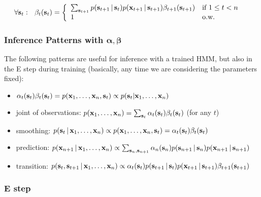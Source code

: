 \documentclass[12pt]{article}
\begin{document}
{\small
	\begin{align*}
	\forall \bolds_t:\ \ 
	\beta_t(\bolds_t)&=\left\{
	\begin{array}{ll}
	\sum_{\bolds_{t+1}} p(\bolds_{t+1}\given\bolds_{t})
	p(\boldx_{t+1}\given\bolds_{t+1})\beta_{t+1}(\bolds_{t+1})
	&\mbox{if $1\leq t< n$}\\
	1 &\mbox{o.w.}
	\end{array}
	\right.
	\end{align*}
}

\subsubsection{Inference Patterns with $\boldsymbol{\alpha},\boldsymbol{\beta}$}

The following patterns are useful for inference with a trained HMM, but also in the E step during training (basically, any time we are considering the parameters fixed):

\begin{itemize}
	
	\item  $\alpha_t(\mathbf{s}_t)\beta_t(\mathbf{s}_t) = p(\mathbf{x}_1,\ldots,\mathbf{x}_n,\mathbf{s}_t) \propto p(\mathbf{s}_t | \mathbf{x}_1,\ldots,\mathbf{x}_n)$
	
	\item joint of observations: $p(\mathbf{x}_1,\ldots,\mathbf{x}_n)=\sum_{\mathbf{s}_t}\alpha_t(\mathbf{s}_t)\beta_t(\mathbf{s}_t)$ (for any $t$)
	
	\item smoothing: $p(\mathbf{s}_t\,|\, \mathbf{x}_1,\ldots,\mathbf{x}_n)\propto p(\mathbf{x}_1,\ldots,\mathbf{x}_n,\mathbf{s}_t)=\alpha_t(\mathbf{s}_t)\beta_t(\mathbf{s}_t)$
	
	\item prediction: $p(\mathbf{x}_{n+1}\,|\, \mathbf{x}_1,\ldots,\mathbf{x}_n)
	\propto\sum_{\mathbf{s}_n, \mathbf{s}_{n+1}}\alpha_n(\mathbf{s}_n)
	p(\mathbf{s}_{n+1}\,|\, \mathbf{s}_n)
	p(\mathbf{x}_{n+1}\,|\, \mathbf{s}_{n+1})$
	
	\item transition: $p(\mathbf{s}_t,\mathbf{s}_{t+1}\,|\, \mathbf{x}_1,\ldots,\mathbf{x}_n)
	\propto\alpha_t(\mathbf{s}_t)p(\mathbf{s}_{t+1}\,|\,\mathbf{s}_t)p(\mathbf{x}_{t+1}\,|\,\mathbf{s}_{t+1})\beta_{t+1}(\mathbf{s}_{t+1})$
	
\end{itemize}

\subsubsection{E step}
\end{document}
